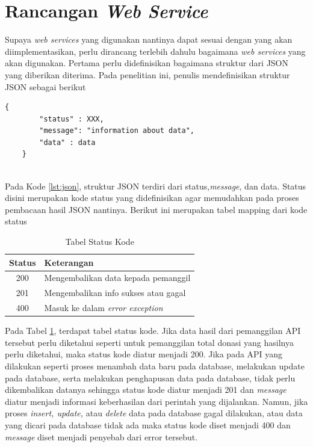 \section{Rancangan \textit{Web Service}}

	Supaya \textit{web services} yang digunakan nantinya dapat sesuai dengan yang akan diimplementasikan, perlu dirancang terlebih dahulu bagaimana \textit{web services} yang akan digunakan. Pertama perlu didefinisikan bagaimana struktur dari JSON yang diberikan diterima. Pada penelitian ini, penulis mendefinisikan struktur JSON sebagai berikut
	
	\begin{minipage}{\linewidth}
	\begin{lstlisting}[caption={Struktur JSON \textit{web services}}, label={lst:json}]
	{
		"status" : XXX,
		"message": "information about data",
		"data" : data
	}
	\end{lstlisting}
	\end{minipage} \\

	Pada Kode \ref{lst:json}, struktur JSON terdiri dari status,\textit{message}, dan data. Status disini merupakan kode status yang didefinisikan agar memudahkan pada proses pembacaan hasil JSON nantinya. Berikut ini merupakan tabel mapping dari kode status
	
	\begin{table}
		\centering
		\caption{Tabel Status Kode}
		\label{tab:statuscode}
		\begin{tabular}{| c | l |}
			\hline
			Status & Keterangan \\ 
			\hline
			200 & Mengembalikan data kepada pemanggil \\
			201 & Mengembalikan info sukses atau gagal \\
			400 & Masuk ke dalam \textit{error exception} \\
			\hline
		\end{tabular}
	\end{table}
	
	Pada Tabel \ref{tab:statuscode}, terdapat tabel status kode. Jika data hasil dari pemanggilan API tersebut perlu diketahui seperti untuk pemanggilan total donasi yang hasilnya perlu diketahui, maka status kode diatur menjadi 200. Jika pada API yang dilakukan seperti proses menambah data baru pada database, melakukan update pada database, serta melakukan penghapusan data pada database, tidak perlu dikembalikan datanya sehingga status kode diatur menjadi 201 dan \textit{message} diatur menjadi informasi keberhasilan dari perintah yang dijalankan. Namun, jika proses \textit{insert, update,} atau \textit{delete} data pada database gagal dilakukan, atau data yang dicari pada database tidak ada maka status kode diset menjadi 400 dan \textit{message} diset menjadi penyebab dari error tersebut.
	
